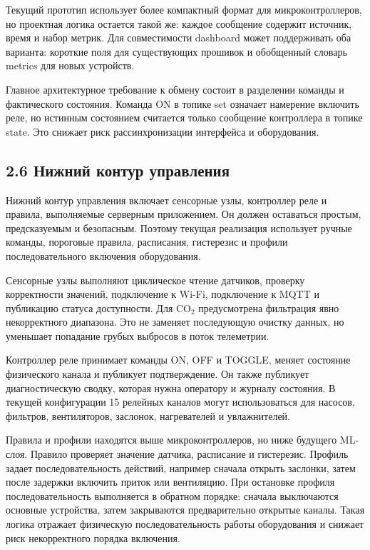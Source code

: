 \documentclass[a4paper,14pt]{extarticle}
\renewcommand{\texttt}[1]{\textnormal{#1}}
\begin{document}
Текущий прототип использует более компактный формат для
микроконтроллеров, но проектная логика остается такой же: каждое
сообщение содержит источник, время и набор метрик. Для совместимости
dashboard может поддерживать оба варианта: короткие поля для
существующих прошивок и обобщенный словарь \texttt{metrics} для новых
устройств.

Главное архитектурное требование к обмену состоит в разделении команды и
фактического состояния. Команда \texttt{ON} в топике \texttt{set}
означает намерение включить реле, но истинным состоянием считается
только сообщение контроллера в топике \texttt{state}. Это снижает риск
рассинхронизации интерфейса и оборудования.

\hypertarget{ux43dux438ux436ux43dux438ux439-ux43aux43eux43dux442ux443ux440-ux443ux43fux440ux430ux432ux43bux435ux43dux438ux44f}{%
\subsection{2.6 Нижний контур
управления}\label{ux43dux438ux436ux43dux438ux439-ux43aux43eux43dux442ux443ux440-ux443ux43fux440ux430ux432ux43bux435ux43dux438ux44f}}

Нижний контур управления включает сенсорные узлы, контроллер реле и
правила, выполняемые серверным приложением. Он должен оставаться
простым, предсказуемым и безопасным. Поэтому текущая реализация
использует ручные команды, пороговые правила, расписания, гистерезис и
профили последовательного включения оборудования.

Сенсорные узлы выполняют циклическое чтение датчиков, проверку
корректности значений, подключение к Wi-Fi, подключение к MQTT и
публикацию статуса доступности. Для CO\(_2\) предусмотрена фильтрация
явно некорректного диапазона. Это не заменяет последующую очистку
данных, но уменьшает попадание грубых выбросов в поток телеметрии.

Контроллер реле принимает команды \texttt{ON}, \texttt{OFF} и
\texttt{TOGGLE}, меняет состояние физического канала и публикует
подтверждение. Он также публикует диагностическую сводку, которая нужна
оператору и журналу состояния. В текущей конфигурации 15 релейных
каналов могут использоваться для насосов, фильтров, вентиляторов,
заслонок, нагревателей и увлажнителей.

Правила и профили находятся выше микроконтроллеров, но ниже будущего
ML-слоя. Правило проверяет значение датчика, расписание и гистерезис.
Профиль задает последовательность действий, например сначала открыть
заслонки, затем после задержки включить приток или вентиляцию. При
остановке профиля последовательность выполняется в обратном порядке:
сначала выключаются основные устройства, затем закрываются
предварительно открытые каналы. Такая логика отражает физическую
последовательность работы оборудования и снижает риск некорректного
порядка включения.
\end{document}
